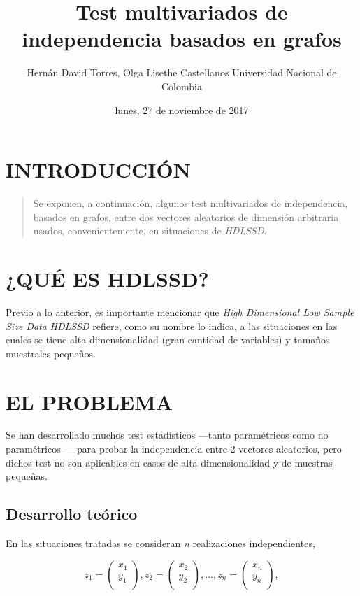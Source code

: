 \documentclass[]{book}
\title{Test multivariados de independencia basados en grafos}
\author{Hernán David Torres, Olga Lisethe Castellanos Universidad Nacional de
Colombia}
\date{lunes, 27 de noviembre de 2017}
\begin{document}
\maketitle

{
\setcounter{tocdepth}{1}
\tableofcontents
}
\chapter{INTRODUCCIÓN}\label{introduccion}

\begin{quote}
Se exponen, a continuación, algunos test multivariados de independencia,
basados en grafos, entre dos vectores aleatorios de dimensión arbitraria
usados, convenientemente, en situaciones de \emph{\emph{HDLSSD}}.
\citep{sarkar2017some}
\end{quote}

\chapter{¿QUÉ ES HDLSSD?}\label{intro}

Previo a lo anterior, es importante mencionar que \emph{\emph{High
Dimensional Low Sample Size Data}} \emph{\emph{HDLSSD}} refiere, como su
nombre lo indica, a las situaciones en las cuales se tiene alta
dimensionalidad (gran cantidad de variables) y tamaños muestrales
pequeños.

\chapter{EL PROBLEMA}\label{el-problema}

Se han desarrollado muchos test estadísticos ---tanto paramétricos como
no paramétricos --- para probar la independencia entre 2 vectores
aleatorios, pero dichos test no son aplicables en casos de alta
dimensionalidad y de muestras pequeñas.

\section{Desarrollo teórico}\label{desarrollo-teorico}

En las situaciones tratadas se consideran \emph{\emph{n}} realizaciones
independientes,

\[
 z_{1} =
\begin{pmatrix} x_1\\
y_1\\
\end{pmatrix} 
 ,  z_{2} =
\begin{pmatrix} x_2\\
y_2\\
\end{pmatrix}, ... ,    z_{n} =
\begin{pmatrix} x_n\\
y_n\\
\end{pmatrix},
\]
\end{document}
